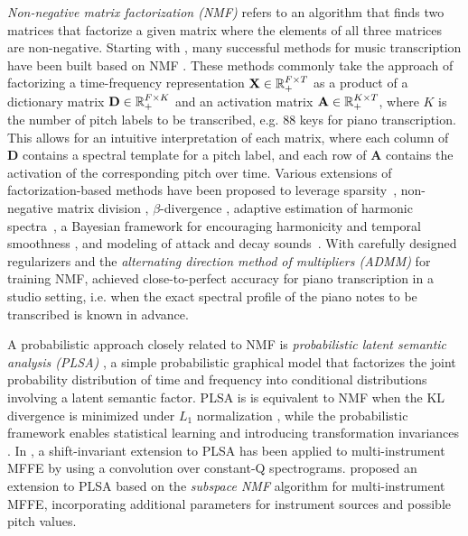 \textit{Non-negative matrix factorization (NMF)} \cite{lee1999nmf,lee2001nmf} refers to an algorithm that finds two matrices that factorize a given matrix where the elements of all three matrices are non-negative.
Starting with , many successful methods for music transcription have been built based on NMF \cite{benetos2019amt}.
These methods commonly take the approach of factorizing a time-frequency representation $\mathbf{X} \in \mathbb{R}_+^{F \times T}$ as a product of a dictionary matrix $\mathbf{D} \in \mathbb{R}_+^{F \times K}$ and an activation matrix $\mathbf{A} \in \mathbb{R}_+^{K \times T}$, where $K$ is the number of pitch labels to be transcribed, e.g. 88 keys for piano transcription.
This allows for an intuitive interpretation of each matrix, where each column of $\mathbf{D}$ contains a spectral template for a pitch label, and each row of $\mathbf{A}$ contains the activation of the corresponding pitch over time.
Various extensions of factorization-based methods have been proposed to leverage sparsity~\cite{abdallah2004sparse,cont2006realtime,costantini2013nmf}, non-negative matrix division \cite{niedermayer2008division}, $\beta$-divergence \cite{dessein2010beta}, adaptive estimation of harmonic spectra~\cite{vincent2010adaptive,fuentes2013harmonic}, a Bayesian framework for encouraging harmonicity and temporal smoothness \cite{bertin2009nmf,bertin2010nmf,peeling2010factorization}, and modeling of attack and decay sounds~\cite{benetos2013multi,ewert2016admm}.
With carefully designed regularizers and the \textit{alternating direction method of multipliers (ADMM)} for training NMF,  achieved close-to-perfect accuracy for piano transcription in a studio setting, i.e. when the exact spectral profile of the piano notes to be transcribed is known in advance.

  


A probabilistic approach closely related to NMF is \textit{probabilistic latent semantic analysis (PLSA)} \cite{hofmann1999plsa}, a simple probabilistic graphical model that factorizes the joint probability distribution of time and frequency into conditional distributions involving a latent semantic factor.
PLSA is is equivalent to NMF when the KL divergence is minimized under $L_1$ normalization \cite{gaussier2005plsa,ding2008equiv}, while the probabilistic framework enables statistical learning and introducing transformation invariances \cite{smaragdis2006latent}.
In \cite{smaragdis2009relative,benetos2012latent}, a shift-invariant extension to PLSA has been applied to multi-instrument MFFE by using a convolution over constant-Q spectrograms.
 proposed an extension to PLSA based on the \textit{subspace NMF} algorithm \cite{grindlay2009eigeninstruments} for multi-instrument MFFE, incorporating additional parameters for instrument sources and possible pitch values.


